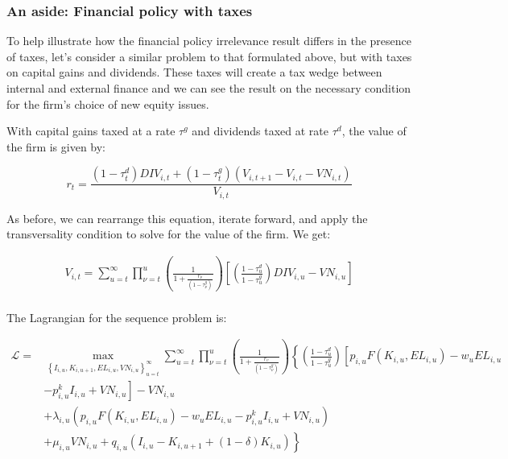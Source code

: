 \documentclass[letterpaper,12pt]{article}
\theoremstyle{definition}
\begin{document}
\begin{spacing}{1.5}
\subsubsection*{An aside: Financial policy with taxes}
To help illustrate how the financial policy irrelevance result differs in the presence of taxes, let's consider a similar problem to that formulated above, but with taxes on capital gains and dividends.  These taxes will create a tax wedge between internal and external finance and we can see the result on the necessary condition for the firm's choice of new equity issues.

With capital gains taxed at a rate $\tau^{g}$ and dividends taxed at rate $\tau^{d}$, the value of the firm is given by:


\begin{equation}
r_{t} = \frac{(1-\tau^{d}_{t})DIV_{i,t}+(1-\tau^{g}_{t})(V_{i,t+1}-V_{i,t}-VN_{i,t})}{V_{i,t}}
\end{equation} 

As before, we can rearrange this equation, iterate forward, and apply the transversality condition to solve for the value of the firm.  We get:

\begin{equation}
\label{eqn:v_firm_tax}
\begin{split}
 V_{i,t}= \sum_{u=t}^{\infty} \prod_{\nu=t}^{u}\left(\frac{1}{1+\frac{r_{\nu}}{(1-\tau^{g}_{\nu})}}\right)\left[ \left(\frac{1-\tau^{d}_{u}}{1-\tau^{g}_{u}}\right)DIV_{i,u}-VN_{i,u} \right] \\
\end{split}
\end{equation}

The Lagrangian for the sequence problem is:

\begin{equation}
\label{eqn:firm_lagrange_tax}
\begin{split}
\mathcal{L} = &  \max_{\left\{I_{i,u},K_{i,u+1},EL_{i,u},VN_{i,u}\right\}_{u=t}^{\infty}} \sum_{u=t}^{\infty} \prod_{\nu=t}^{u} \left(\frac{1}{1+\frac{r_{v}}{(1-\tau^{g}_{\nu})}}\right)\left\{ \left(\frac{1-\tau^{d}_{u}}{1-\tau^{g}_{u}}\right) \left[p_{i,u}F(K_{i,u},EL_{i,u}) - w_{u}EL_{i,u} \right. \right.\\
       & \left. \left. -p^{k}_{i,u}I_{i,u} +VN_{i,u}\right] - VN_{i,u} \right. \\
       &+\left. \lambda_{i,u}(p_{i,u}F(K_{i,u},EL_{i,u}) - w_{u}EL_{i,u} -p^{k}_{i,u}I_{i,u} +VN_{i,u}) \right. \\
       &+ \left. \mu_{i,u}VN_{i,u} + q_{i,u}(I_{i,u} - K_{i,u+1} + (1-\delta)K_{i,u})\right\} \\
\end{split}
\end{equation}


\end{spacing}
\end{document}
